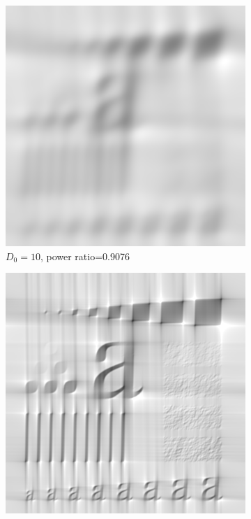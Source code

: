 \begin{figure}[h!]
	\centering
	\begin{subfigure}[b]{0.45\linewidth}
		\includegraphics[width=\linewidth]{myfigure/p3/BLPF_10.png}
		\caption{$D_0=10$, power ratio=0.9076}
		\label{fig:BLPF_10}
	\end{subfigure}
  	\begin{subfigure}[b]{0.45\linewidth}
		\includegraphics[width=\linewidth]{myfigure/p3/BLPF_100.png}

\end{subfigure}
\end{figure}
